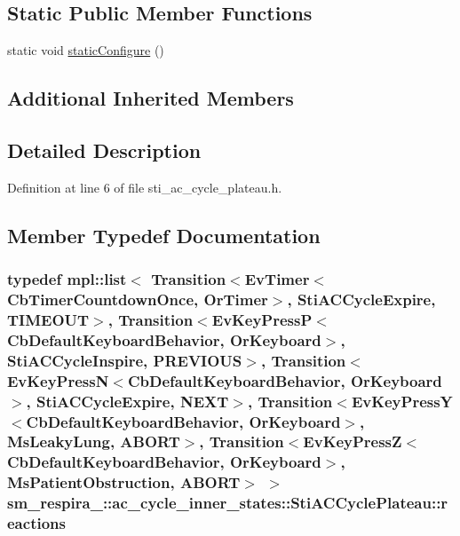 \subsection*{Static Public Member Functions}
\begin{DoxyCompactItemize}
\item 
static void \hyperlink{structsm__respira__1_1_1ac__cycle__inner__states_1_1StiACCyclePlateau_acd9c1825ab6f8affc0add631b4203b5b}{static\+Configure} ()
\end{DoxyCompactItemize}
\subsection*{Additional Inherited Members}


\subsection{Detailed Description}


Definition at line 6 of file sti\+\_\+ac\+\_\+cycle\+\_\+plateau.\+h.



\subsection{Member Typedef Documentation}
\subsubsection[{\texorpdfstring{reactions}{reactions}}]{\setlength{\rightskip}{0pt plus 5cm}typedef mpl\+::list$<$ Transition$<$Ev\+Timer$<$Cb\+Timer\+Countdown\+Once, {\bf Or\+Timer}$>$, {\bf Sti\+A\+C\+Cycle\+Expire}, {\bf T\+I\+M\+E\+O\+UT}$>$, Transition$<$Ev\+Key\+PressP$<$Cb\+Default\+Keyboard\+Behavior, {\bf Or\+Keyboard}$>$, {\bf Sti\+A\+C\+Cycle\+Inspire}, {\bf P\+R\+E\+V\+I\+O\+US}$>$, Transition$<$Ev\+Key\+PressN$<$Cb\+Default\+Keyboard\+Behavior, {\bf Or\+Keyboard}$>$, {\bf Sti\+A\+C\+Cycle\+Expire}, {\bf N\+E\+XT}$>$, Transition$<$Ev\+Key\+PressY$<$Cb\+Default\+Keyboard\+Behavior, {\bf Or\+Keyboard}$>$, {\bf Ms\+Leaky\+Lung}, {\bf A\+B\+O\+RT}$>$, Transition$<$Ev\+Key\+PressZ$<$Cb\+Default\+Keyboard\+Behavior, {\bf Or\+Keyboard}$>$, {\bf Ms\+Patient\+Obstruction}, {\bf A\+B\+O\+RT}$>$ $>$ {\bf sm\+\_\+respira\+\_\+::ac\+\_\+cycle\+\_\+inner\+\_\+states\+::\+Sti\+A\+C\+Cycle\+Plateau\+::reactions}}\hypertarget{structsm__respira__1_1_1ac__cycle__inner__states_1_1StiACCyclePlateau_acd9cc5abce31b5649c617b58ad22a89d}{}\label{structsm__respira__1_1_1ac__cycle__inner__states_1_1StiACCyclePlateau_acd9cc5abce31b5649c617b58ad22a89d}



